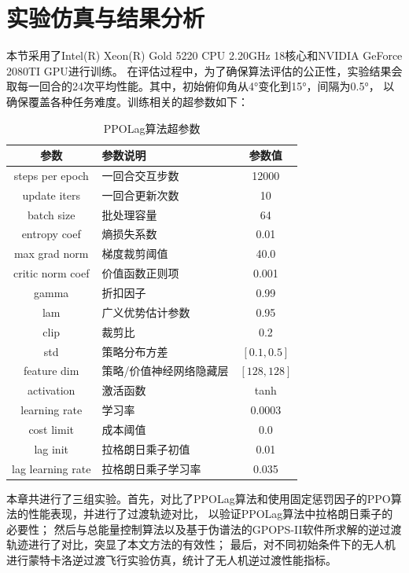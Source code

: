 \section{实验仿真与结果分析}
本节采用了Intel(R) Xeon(R) Gold 5220 CPU 2.20GHz 18核心和NVIDIA GeForce 2080TI GPU进行训练。
在评估过程中，为了确保算法评估的公正性，实验结果会取每一回合的24次平均性能。其中，初始俯仰角从4°变化到15°，间隔为0.5°，
以确保覆盖各种任务难度。训练相关的超参数如下：
\begin{table}[H]
    \centering
    \caption{\label{tab:algoconfig}PPOLag算法超参数}
    \begin{tabularx}{0.7\linewidth}{|c|X|c|}
        \hline
        参数 & 参数说明 & 参数值 \\ \hline
        steps per epoch & 一回合交互步数 & 12000 \\ \hline
        update iters & 一回合更新次数 & 10 \\ \hline
        batch size & 批处理容量 & 64 \\ \hline
        entropy coef & 熵损失系数 & 0.01 \\ \hline
        max grad norm & 梯度裁剪阈值 & 40.0 \\ \hline
        critic norm coef & 价值函数正则项 & 0.001 \\ \hline
        gamma & 折扣因子 & 0.99 \\ \hline
        lam & 广义优势估计参数 & 0.95 \\ \hline
        clip & 裁剪比 & 0.2 \\ \hline
        std & 策略分布方差 & $[0.1,0.5]$ \\ \hline
        feature dim & 策略/价值神经网络隐藏层 & $[128,128]$ \\ \hline
        activation & 激活函数 & tanh \\ \hline
        learning rate & 学习率 & 0.0003 \\ \hline
        cost limit & 成本阈值 & 0.0 \\ \hline
        lag init & 拉格朗日乘子初值 & 0.01 \\ \hline
        lag learning rate & 拉格朗日乘子学习率 & 0.035 \\ \hline
    \end{tabularx}
\end{table}


本章共进行了三组实验。首先，对比了PPOLag算法和使用固定惩罚因子的PPO算法的性能表现，并进行了过渡轨迹对比，
以验证PPOLag算法中拉格朗日乘子的必要性；
然后与总能量控制算法以及基于伪谱法的GPOPS-II软件所求解的逆过渡轨迹进行了对比，突显了本文方法的有效性；
最后，对不同初始条件下的无人机进行蒙特卡洛逆过渡飞行实验仿真，统计了无人机逆过渡性能指标。


